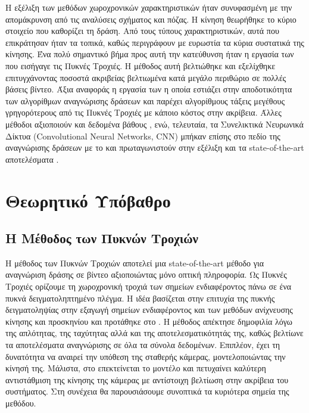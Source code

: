 \documentclass[11pt,a4paper,english,greek,twoside]{../Thesis}
\begin{document}
\par Η εξέλιξη των μεθόδων χωροχρονικών χαρακτηριστικών ήταν συνυφασμένη με την απομάκρυνση από τις αναλύσεις σχήματος και πόζας. Η κίνηση θεωρήθηκε το κύριο στοιχείο που καθορίζει τη δράση. Από τους τύπους χαρακτηριστικών, αυτά που επικράτησαν ήταν τα τοπικά, καθώς περιγράφουν με ευρωστία τα κύρια συστατικά της κίνησης. Ένα πολύ σημαντικό βήμα προς αυτή την κατεύθυνση ήταν η εργασία των \cite{wang_2011} που εισήγαγε τις Πυκνές Τροχιές. Η μέθοδος αυτή βελτιώθηκε και εξελίχθηκε \cite{wang_2013} επιτυγχάνοντας ποσοστά ακριβείας βελτιωμένα κατά μεγάλο περιθώριο σε πολλές βάσεις βίντεο. Άξια αναφοράς η εργασία των \cite{kantorov_2014} η οποία εστιάζει στην αποδοτικότητα των αλγορίθμων αναγνώρισης δράσεων και παρέχει αλγορίθμους τάξεις μεγέθους γρηγορότερους από τις Πυκνές Τροχιές με κάποιο κόστος στην ακρίβεια. Άλλες μέθοδοι αξιοποιούν και δεδομένα βάθους \cite{chen_2013}, ενώ, τελευταία, τα Συνελικτικά Νευρωνικά Δίκτυα (Convolutional Neural Networks, CNN) μπήκαν επίσης στο πεδίο της αναγνώρισης δράσεων με το \cite{karpathy_2014} και πρωταγωνιστούν στην εξέλιξη και τα state-of-the-art αποτελέσματα \cite{cherian_2017}.


\section{Θεωρητικό Υπόβαθρο}

\subsection{Η Μέθοδος των Πυκνών Τροχιών}
Η μέθοδος των Πυκνών Τροχιών αποτελεί μια state-of-the-art μέθοδο για αναγνώριση δράσης σε βίντεο αξιοποιώντας μόνο οπτική πληροφορία. Ως Πυκνές Τροχιές ορίζουμε τη χωροχρονική τροχιά των σημείων ενδιαφέροντος πάνω σε ένα πυκνά δειγματοληπτημένο πλέγμα. Η ιδέα βασίζεται στην επιτυχία της πυκνής δειγματοληψίας \cite{wang_2009} στην εξαγωγή σημείων ενδιαφέροντος και των μεθόδων ανίχνευσης κίνησης και προσκηνίου και προτάθηκε στο \cite{wang_2011}. Η μέθοδος απέκτησε δημοφιλία λόγω της απλότητας, της ταχύτητας αλλά και της αποτελεσματικότητάς της, καθώς βελτίωνε τα αποτελέσματα αναγνώρισης σε όλα τα σύνολα δεδομένων. Επιπλέον, έχει τη δυνατότητα να αναιρεί την υπόθεση της σταθερής κάμερας, μοντελοποιώντας την κίνησή της. Μάλιστα, στο \cite{wang_2013} επεκτείνεται το μοντέλο και πετυχαίνει καλύτερη αντιστάθμιση της κίνησης της κάμερας με αντίστοιχη βελτίωση στην ακρίβεια του συστήματος. Στη συνέχεια θα παρουσιάσουμε συνοπτικά τα κυριότερα σημεία της μεθόδου.
\end{document}
